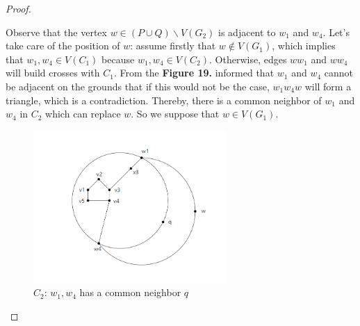 \begin{proof}
\begin{itemize}
\begin{figure}[H]
    \label{figure} %
    \end{figure}
Observe that the vertex $w \in (P \cup Q) \backslash V(G_2)$ is adjacent to $w_1$ and $w_4$. Let's take care of the position of $w$: assume firstly that $w \notin V(G_1)$, which implies that $w_1, w_4 \in V(C_1)$ because $w_1, w_4 \in V(C_2)$. Otherwise, edges $ww_1$ and $ww_4$ will build crosses with $C_1$. From the \textbf{Figure 19.} informed that $w_1$ and $w_4$ cannot be adjacent on the grounds that if this would not be the case, $w_1w_4w$ will form a triangle, which is a contradiction. Thereby, there is a common neighbor of $w_1$ and $w_4$ in $C_2$ which can replace $w$. So we suppose that $w \in V(G_1)$.

\begin{figure}[H] %
    \centering %
    \includegraphics[width=0.65\textwidth]{figure/contradictionlemma2.2.1.png} 
    \caption{$C_2$: $w_1, w_4$ has a common neighbor $q$ } %
    \label{figure} %
\end{figure}


\end{itemize}
\end{proof}
